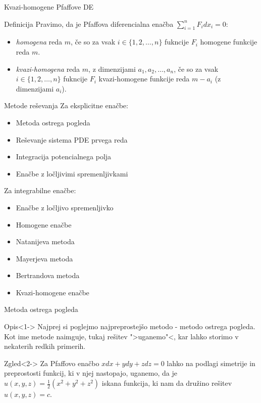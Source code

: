 \documentclass[t, 10pt]{beamer} %
\newcommand{\pojem}[1]{\emph{#1}}
\newcommand{\fillblack}[1]{
	\begin{tikzpicture}[remember picture, overlay]
		\node [shift={(0 cm,0cm)}]  at (current page.south west)
		{%
			\begin{tikzpicture}[remember picture, overlay] at (current page.south west)
				\draw [fill=black] (0, 0) -- (0,#1 \paperheight) --
				(\paperwidth,#1 \paperheight) -- (\paperwidth,0) -- cycle ;
			\end{tikzpicture}
		};
		\draw (current page.north west) rectangle (current page.south east);
	\end{tikzpicture}
}
\begin{document}
		\begin{frame}{Kvazi-homogene Pfaffove DE}
			\begin{block}{Definicija}
				Pravimo, da je Pfaffova diferencialna enačba $\sum_{i = 1}^n F_i dx_i = 0$:\begin{itemize}
					\item \pojem{homogena} reda $m$, če so za vsak $i\in\{1, 2, \ldots, n\}$ fukncije $F_i$ homogene funkcije reda $m$.
					\item \pojem{kvazi-homogena} reda $m$, z dimenzijami $a_1, a_2, \ldots, a_n$, če so za vsak $i\in\{1, 2, \ldots, n\}$ fukncije $F_i$ kvazi-homogene funkcije reda $m - a_i$ (z dimenzijami $a_i$).
				\end{itemize} 
			\end{block}
		\end{frame}
		
		\begin{frame}{Metode reševanja}
			Za eksplicitne enačbe:\begin{itemize}
				\item Metoda ostrega pogleda
				\item Reševanje sistema PDE prvega reda
				\item Integracija potencialnega polja
				\item Enačbe z ločljivimi spremenljivkami
			\end{itemize}
			
			Za integrabilne enačbe:\begin{itemize}
				\item Enačbe z ločljivo spremenljivko
				\item Homogene enačbe
				\item Natanijeva metoda
				\item Mayerjeva metoda
				\item Bertrandova metoda
				\item Kvazi-homogene enačbe
			\end{itemize}
		\end{frame}
		
		\begin{frame}{Metoda ostrega pogleda}
			\begin{block}{Opis}<1->
					Najprej si poglejmo najpreprostejšo metodo - metodo ostrega pogleda. Kot ime metode naimguje, tukaj rešitev ">uganemo"<, kar lahko storimo v nekaterih redkih primerih. 
			\end{block}
			\begin{block}{Zgled}<2->
					Za Pfaffovo enačbo $xdx + ydy + zdz = 0$ lahko na podlagi simetrije in preprostosti funkcij, ki v njej nastopajo, uganemo, da je $u(x, y, z) = \frac{1}{2}(x^2 + y^2 + z^2)$ iskana funkcija, ki nam da družino rešitev $u(x, y, z) = c$.
			\end{block}
		\end{frame}
		
\end{document}
